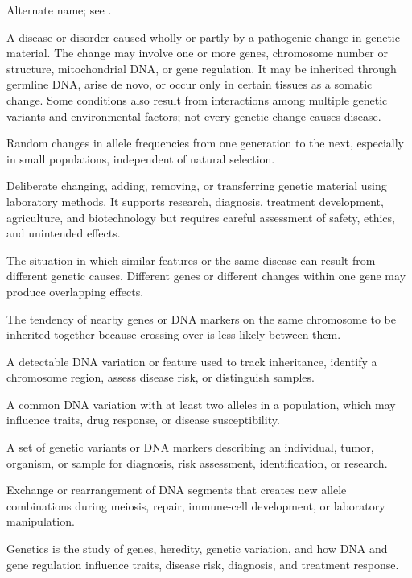  Alternate name; see .

 A disease or disorder caused wholly or partly by a pathogenic change in genetic material. The change may involve one or more genes, chromosome number or structure, mitochondrial DNA, or gene regulation. It may be inherited through germline DNA, arise de novo, or occur only in certain tissues as a somatic change. Some conditions also result from interactions among multiple genetic variants and environmental factors; not every genetic change causes disease.

 Random changes in allele frequencies from one generation to the next, especially in small populations, independent of natural selection.

 Deliberate changing, adding, removing, or transferring genetic material using laboratory methods. It supports research, diagnosis, treatment development, agriculture, and biotechnology but requires careful assessment of safety, ethics, and unintended effects.

 The situation in which similar features or the same disease can result from different genetic causes. Different genes or different changes within one gene may produce overlapping effects.

 The tendency of nearby genes or DNA markers on the same chromosome to be inherited together because crossing over is less likely between them.

 A detectable DNA variation or feature used to track inheritance, identify a chromosome region, assess disease risk, or distinguish samples.

 A common DNA variation with at least two alleles in a population, which may influence traits, drug response, or disease susceptibility.

 A set of genetic variants or DNA markers describing an individual, tumor, organism, or sample for diagnosis, risk assessment, identification, or research.

 Exchange or rearrangement of DNA segments that creates new allele combinations during meiosis, repair, immune-cell development, or laboratory manipulation.

 Genetics is the study of genes, heredity, genetic variation, and how DNA and gene regulation influence traits, disease risk, diagnosis, and treatment response.

